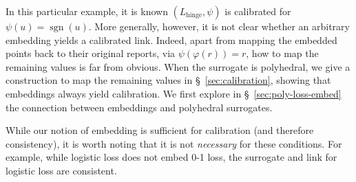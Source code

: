 \documentclass[11pt]{article}
\newcommand{\Comments}{1}
\newcommand{\mynote}[2]{\ifnum\Comments=1\textcolor{#1}{#2}\fi}
\newcommand{\raf}[1]{\mynote{darkgreen}{[RF: #1]}}
\newcommand{\jessie}[1]{\mynote{teal}{[JF: #1]}}
\newcommand{\simplex}{\Delta_\Y}
\newcommand{\R}{\mathcal{R}}
\newcommand{\Y}{\mathcal{Y}}
\newcommand{\inprod}[2]{\langle #1, #2 \rangle}%
\newcommand{\hinge}{L_{\mathrm{hinge}}}
\newcommand{\ellzo}{\ell_{\text{0-1}}}
\DeclareMathOperator*{\argmax}{arg\,max}
\DeclareMathOperator*{\sgn}{sgn}
\begin{document}
In this particular example, it is known $(\hinge,\psi)$ is calibrated for $\psi(u) = \sgn(u)$.
More generally, however, it is not clear whether an arbitrary embedding yields a calibrated link.
Indeed, apart from mapping the embedded points back to their original reports, via $\psi(\varphi(r)) = r$, how to map the remaining values is far from obvious.
When the surrogate is polyhedral, we give a construction to map the remaining values in \S~\ref{sec:calibration}, showing that embeddings always yield calibration.
We first explore in \S~\ref{sec:poly-loss-embed} the connection between embeddings and polyhedral surrogates.

While our notion of embedding is sufficient for calibration (and therefore consistency), it is worth noting that it is not \emph{necessary} for these conditions.  
For example, while logistic loss does not embed 0-1 loss, the surrogate and link for logistic loss are consistent.








\end{document}
